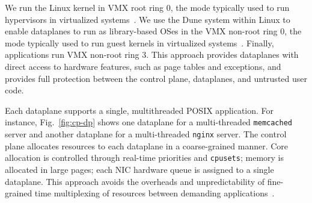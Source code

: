 We run the Linux kernel in VMX root ring 0, the mode typically used to
run hypervisors in virtualized
systems~\cite{DBLP:journals/computer/UhligNRSMABKLS05}. We use the
Dune system within Linux to enable dataplanes to run as library-based
OSes in the VMX non-root ring 0, the mode typically used to run guest
kernels in virtualized systems~\cite{belay2012dune}. %
Finally, applications run VMX non-root ring 3. This
approach provides dataplanes with direct access to hardware features,
such as page tables and exceptions, and provides full protection
between the control plane, dataplanes, and untrusted user
code. %




Each \ix dataplane supports a single, multithreaded POSIX
application. For instance, Fig.~\ref{fig:cp-dp} shows one dataplane
for a multi-threaded \texttt{memcached} server and another dataplane
for a multi-threaded \texttt{nginx} server. The control plane allocates
resources to each dataplane in a coarse-grained manner. Core allocation
is controlled through real-time priorities and \texttt{cpusets};
memory is allocated in large pages; each NIC hardware queue is
assigned to a single dataplane. This approach avoids the overheads and
unpredictability of fine-grained time multiplexing of resources between
demanding applications~\cite{Leverich:RHSU:2014}.

